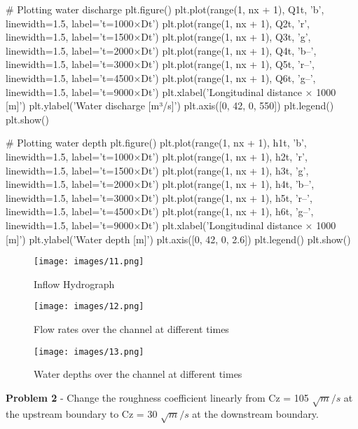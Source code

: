 \documentclass{article}
\begin{document}
\begin{ColoredVerbatim}[formatcom=\color{red}]
    # Plotting water discharge
    plt.figure()
    plt.plot(range(1, nx + 1), Q1t, 'b', linewidth=1.5, label='t=1000×Dt')
    plt.plot(range(1, nx + 1), Q2t, 'r', linewidth=1.5, label='t=1500×Dt')
    plt.plot(range(1, nx + 1), Q3t, 'g', linewidth=1.5, label='t=2000×Dt')
    plt.plot(range(1, nx + 1), Q4t, 'b--', linewidth=1.5, label='t=3000×Dt')
    plt.plot(range(1, nx + 1), Q5t, 'r--', linewidth=1.5, label='t=4500×Dt')
    plt.plot(range(1, nx + 1), Q6t, 'g--', linewidth=1.5, label='t=9000×Dt')
    plt.xlabel('Longitudinal distance × 1000 [m]')
    plt.ylabel('Water discharge [m³/s]')
    plt.axis([0, 42, 0, 550])
    plt.legend()
    plt.show()
    
    # Plotting water depth
    plt.figure()
    plt.plot(range(1, nx + 1), h1t, 'b', linewidth=1.5, label='t=1000×Dt')
    plt.plot(range(1, nx + 1), h2t, 'r', linewidth=1.5, label='t=1500×Dt')
    plt.plot(range(1, nx + 1), h3t, 'g', linewidth=1.5, label='t=2000×Dt')
    plt.plot(range(1, nx + 1), h4t, 'b--', linewidth=1.5, label='t=3000×Dt')
    plt.plot(range(1, nx + 1), h5t, 'r--', linewidth=1.5, label='t=4500×Dt')
    plt.plot(range(1, nx + 1), h6t, 'g--', linewidth=1.5, label='t=9000×Dt')
    plt.xlabel('Longitudinal distance × 1000 [m]')
    plt.ylabel('Water depth [m]')
    plt.axis([0, 42, 0, 2.6])
    plt.legend()
    plt.show()
    
\end{ColoredVerbatim}

\begin{figure}[H]
    \centering
    \texttt{[image: images/11.png]}
    \caption{Inflow Hydrograph}
    \label{fig:sample}
\end{figure}    
    
\begin{figure}[H]
    \centering
    \texttt{[image: images/12.png]}
    \caption{Flow rates over the channel at different times}
    \label{fig:sample}
\end{figure}

\begin{figure}[H]
    \centering
    \texttt{[image: images/13.png]}
    \caption{Water depths over the channel at different times}
    \label{fig:sample}
\end{figure}

\begin{tcolorbox}[colback=yellow!40!white, colframe=black, width=\textwidth, boxrule=0.5mm, sharp corners, left=1mm, right=1mm, top=1mm, bottom=1mm]
\textbf{Problem 2} 
-  Change the roughness coefficient linearly from Cz = 105 \(\sqrt{m}/s\) at the 
upstream boundary to Cz = 30 \(\sqrt{m}/s\) at the downstream boundary. 
\end{tcolorbox}
\end{document}
